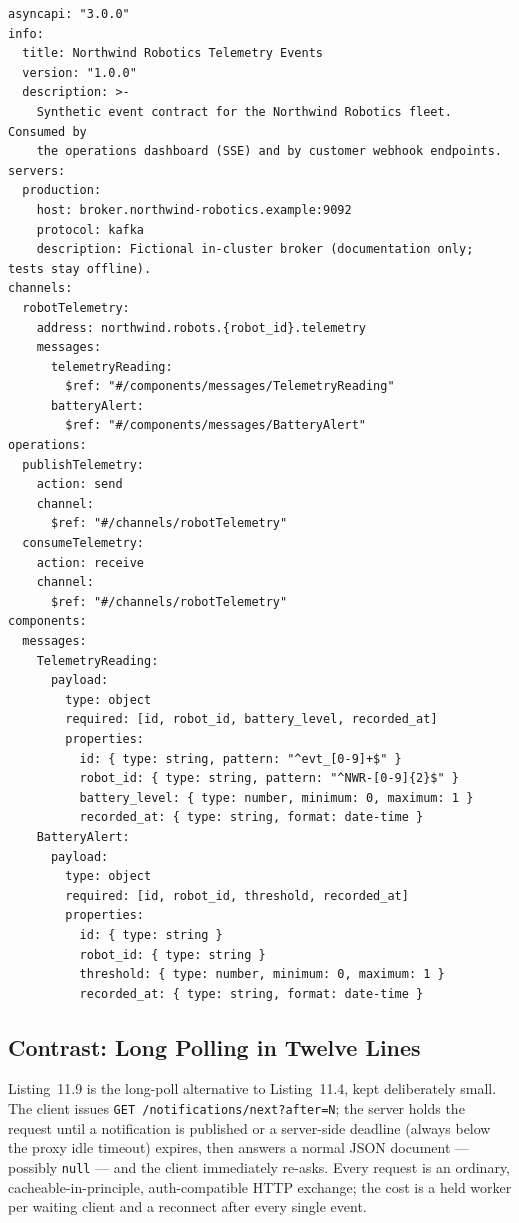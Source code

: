 \begin{verbatim}
asyncapi: "3.0.0"
info:
  title: Northwind Robotics Telemetry Events
  version: "1.0.0"
  description: >-
    Synthetic event contract for the Northwind Robotics fleet. Consumed by
    the operations dashboard (SSE) and by customer webhook endpoints.
servers:
  production:
    host: broker.northwind-robotics.example:9092
    protocol: kafka
    description: Fictional in-cluster broker (documentation only; tests stay offline).
channels:
  robotTelemetry:
    address: northwind.robots.{robot_id}.telemetry
    messages:
      telemetryReading:
        $ref: "#/components/messages/TelemetryReading"
      batteryAlert:
        $ref: "#/components/messages/BatteryAlert"
operations:
  publishTelemetry:
    action: send
    channel:
      $ref: "#/channels/robotTelemetry"
  consumeTelemetry:
    action: receive
    channel:
      $ref: "#/channels/robotTelemetry"
components:
  messages:
    TelemetryReading:
      payload:
        type: object
        required: [id, robot_id, battery_level, recorded_at]
        properties:
          id: { type: string, pattern: "^evt_[0-9]+$" }
          robot_id: { type: string, pattern: "^NWR-[0-9]{2}$" }
          battery_level: { type: number, minimum: 0, maximum: 1 }
          recorded_at: { type: string, format: date-time }
    BatteryAlert:
      payload:
        type: object
        required: [id, robot_id, threshold, recorded_at]
        properties:
          id: { type: string }
          robot_id: { type: string }
          threshold: { type: number, minimum: 0, maximum: 1 }
          recorded_at: { type: string, format: date-time }
\end{verbatim}

\subsection{Contrast: Long Polling in Twelve Lines}
\label{sec:ch11-code-longpoll}

Listing~11.9 is the long-poll alternative to Listing~11.4, kept deliberately
small. The client issues \texttt{GET /notifications/next?after=N}; the server
holds the request until a notification is published or a server-side deadline
(always below the proxy idle timeout) expires, then answers a normal JSON
document --- possibly \texttt{null} --- and the client immediately re-asks.
Every request is an ordinary, cacheable-in-principle, auth-compatible HTTP
exchange; the cost is a held worker per waiting client and a reconnect after
every single event.


